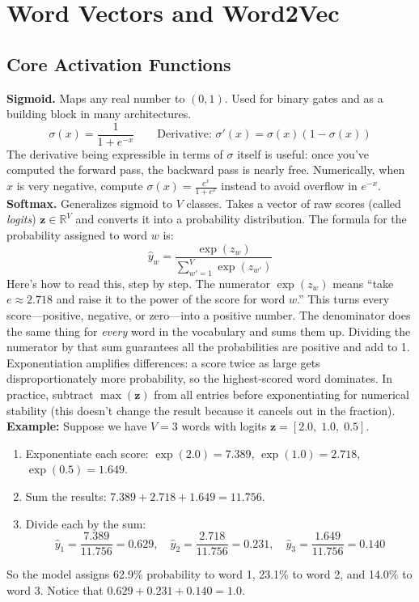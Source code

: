 \documentclass[11pt]{article}
\begin{document}
\section{Word Vectors and Word2Vec}
\subsection{Core Activation Functions}
\textbf{Sigmoid.} Maps any real number to $(0, 1)$. Used for binary gates and as a building block in many architectures.
\[
\sigma(x) = \frac{1}{1 + e^{-x}} \qquad \text{Derivative: } \sigma'(x) = \sigma(x)(1 - \sigma(x))
\]
The derivative being expressible in terms of $\sigma$ itself is useful: once you've computed the forward pass, the backward pass is nearly free. Numerically, when $x$ is very negative, compute $\sigma(x) = \frac{e^x}{1 + e^x}$ instead to avoid overflow in $e^{-x}$.
\textbf{Softmax.} Generalizes sigmoid to $V$ classes. Takes a vector of raw scores (called \textit{logits}) $\mathbf{z} \in \mathbb{R}^V$ and converts it into a probability distribution. The formula for the probability assigned to word $w$ is:
\[
\hat{y}_w = \frac{\exp(z_w)}{\sum_{w'=1}^{V} \exp(z_{w'})}
\]
Here's how to read this, step by step. The numerator $\exp(z_w)$ means ``take $e \approx 2.718$ and raise it to the power of the score for word $w$.'' This turns every score---positive, negative, or zero---into a positive number. The denominator does the same thing for \textit{every} word in the vocabulary and sums them up. Dividing the numerator by that sum guarantees all the probabilities are positive and add to 1.
Exponentiation amplifies differences: a score twice as large gets disproportionately more probability, so the highest-scored word dominates. In practice, subtract $\max(\mathbf{z})$ from all entries before exponentiating for numerical stability (this doesn't change the result because it cancels out in the fraction).
\textbf{Example:} Suppose we have $V = 3$ words with logits $\mathbf{z} = [2.0,\; 1.0,\; 0.5]$.
\begin{enumerate}[nosep, leftmargin=*]
\item Exponentiate each score: $\exp(2.0) = 7.389$, \; $\exp(1.0) = 2.718$, \; $\exp(0.5) = 1.649$.
\item Sum the results: $7.389 + 2.718 + 1.649 = 11.756$.
\item Divide each by the sum:
\[
\hat{y}_1 = \frac{7.389}{11.756} = 0.629, \quad
\hat{y}_2 = \frac{2.718}{11.756} = 0.231, \quad
\hat{y}_3 = \frac{1.649}{11.756} = 0.140
\]
\end{enumerate}
So the model assigns 62.9\% probability to word 1, 23.1\% to word 2, and 14.0\% to word 3. Notice that $0.629 + 0.231 + 0.140 = 1.0$.
\end{document}
